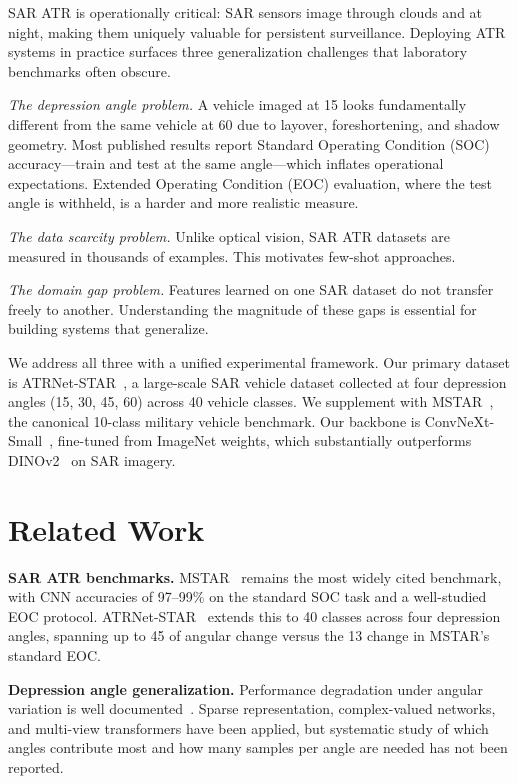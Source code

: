 \documentclass[journal]{IEEEtran}
\begin{document}
SAR ATR is operationally critical: SAR sensors image through clouds and at
night, making them uniquely valuable for persistent surveillance. Deploying
ATR systems in practice surfaces three generalization challenges that
laboratory benchmarks often obscure.

\textit{The depression angle problem.} A vehicle imaged at 15\textdegree{}
looks fundamentally different from the same vehicle at 60\textdegree{} due to
layover, foreshortening, and shadow geometry. Most published results report
Standard Operating Condition (SOC) accuracy---train and test at the same
angle---which inflates operational expectations. Extended Operating Condition
(EOC) evaluation, where the test angle is withheld, is a harder and more
realistic measure.

\textit{The data scarcity problem.} Unlike optical vision, SAR ATR datasets
are measured in thousands of examples. This motivates few-shot approaches.

\textit{The domain gap problem.} Features learned on one SAR dataset do not
transfer freely to another. Understanding the magnitude of these gaps is
essential for building systems that generalize.

We address all three with a unified experimental framework. Our primary
dataset is ATRNet-STAR~\cite{atrnet}, a large-scale SAR vehicle dataset
collected at four depression angles (15\textdegree, 30\textdegree,
45\textdegree, 60\textdegree) across 40 vehicle classes. We supplement with
MSTAR~\cite{mstar}, the canonical 10-class military vehicle benchmark. Our
backbone is ConvNeXt-Small~\cite{convnext}, fine-tuned from ImageNet weights,
which substantially outperforms DINOv2~\cite{dinov2} on SAR imagery.

\section{Related Work}

\textbf{SAR ATR benchmarks.} MSTAR~\cite{mstar} remains the most widely
cited benchmark, with CNN accuracies of 97--99\% on the standard SOC task and
a well-studied EOC protocol. ATRNet-STAR~\cite{atrnet} extends this to 40
classes across four depression angles, spanning up to 45\textdegree{} of
angular change versus the 13\textdegree{} change in MSTAR's standard EOC.

\textbf{Depression angle generalization.} Performance degradation under
angular variation is well documented~\cite{atrnet}. Sparse representation,
complex-valued networks, and multi-view transformers have been applied, but
systematic study of which angles contribute most and how many samples per
angle are needed has not been reported.
\end{document}
